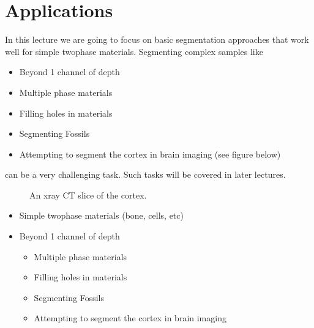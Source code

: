 \documentclass[letterpaper,10pt,english]{sphinxmanual}
\begin{document}
\chapter{Applications}
\label{\detokenize{04-BasicSegmentation:applications}}
\sphinxAtStartPar
In this lecture we are going to focus on basic segmentation approaches that work well for simple two\sphinxhyphen{}phase materials. Segmenting complex samples like
\begin{itemize}
\item {} 
\sphinxAtStartPar
Beyond 1 channel of depth

\item {} 
\sphinxAtStartPar
Multiple phase materials

\item {} 
\sphinxAtStartPar
Filling holes in materials

\item {} 
\sphinxAtStartPar
Segmenting Fossils

\item {} 
\sphinxAtStartPar
Attempting to segment the cortex in brain imaging (see figure below)

\end{itemize}

\sphinxAtStartPar
can be a very challenging task. Such tasks will be covered in later lectures.

\begin{figure}[htbp]
\centering
\capstart

\noindent{}
\caption{An x\sphinxhyphen{}ray CT slice of the cortex.
\textasciigrave{}\textasciigrave{}}\label{\detokenize{04-BasicSegmentation:id2}}\end{figure}


\begin{itemize}
\item {} 
\sphinxAtStartPar
Simple two\sphinxhyphen{}phase materials (bone, cells, etc)

\item {} 
\sphinxAtStartPar
Beyond 1 channel of depth
\begin{itemize}
\item {} 
\sphinxAtStartPar
Multiple phase materials

\item {} 
\sphinxAtStartPar
Filling holes in materials

\item {} 
\sphinxAtStartPar
Segmenting Fossils

\item {} 
\sphinxAtStartPar
Attempting to segment the cortex in brain imaging

\end{itemize}

\end{itemize}
\end{document}
